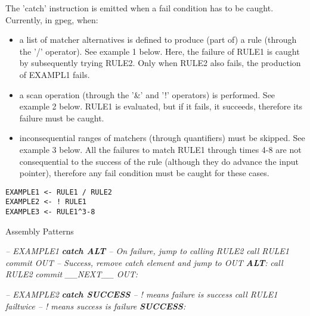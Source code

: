The 'catch' instruction is emitted when a fail condition has to be
caught. Currently, in gpeg, when:

\begin{itemize}
\item a list of matcher alternatives is defined to produce (part of) a rule
      (through the '/' operator). See example 1 below.
      Here, the failure of RULE1 is caught by subsequently trying RULE2.
      Only when RULE2 also fails, the production of EXAMPL1 fails.
\item a scan operation (through the '\&' and '!' operators) is performed.
      See example 2 below. RULE1 is evaluated, but if it fails, it succeeds,
      therefore its failure must be caught.
\item inconsequential ranges of matchers (through quantifiers) must be skipped.
      See example 3 below. All the failures to match RULE1 through times
      4-8 are not consequential to the success of the rule (although they
      do advance the input pointer), therefore any fail condition must be
      caught for these cases.
\end{itemize}

\begin{myquote}
\begin{verbatim}
EXAMPLE1 <- RULE1 / RULE2
EXAMPLE2 <- ! RULE1
EXAMPLE3 <- RULE1^3-8
\end{verbatim}
\end{myquote}

Assembly Patterns

\begin{myquote}
\textit{-- EXAMPLE1} \newline
\textit{\textbf{catch ALT} -- On failure, jump to calling RULE2} \newline
\textit{call RULE1} \newline
\textit{commit OUT -- Success, remove catch element and jump to OUT} \newline
\textit{\textbf{ALT}:} \newline
\textit{call RULE2} \newline
\textit{commit \_\_NEXT\_\_} \newline
\textit{OUT:} \newline
\end{myquote}

\begin{myquote}
\textit{-- EXAMPLE2} \newline
\textit{\textbf{catch SUCCESS} -- ! means failure is success} \newline
\textit{call RULE1} \newline
\textit{failtwice -- ! means success is failure} \newline
\textit{\textbf{SUCCESS}:} \newline
\end{myquote}

